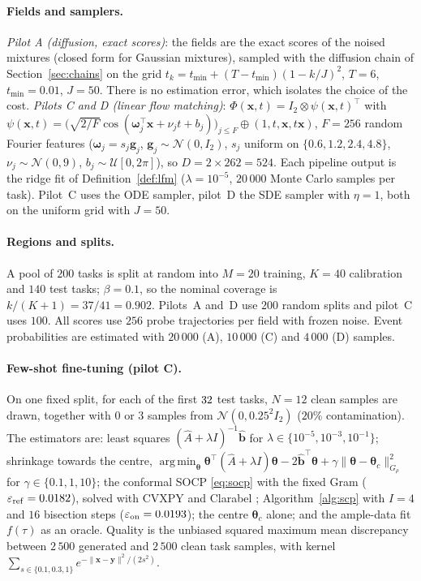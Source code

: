 \documentclass{article}
\DeclareMathOperator*{\argmin}{arg\,min}
\newcommand{\bth}{\boldsymbol{\theta}}
\newcommand{\bx}{\mathbf{x}}
\newcommand{\by}{\mathbf{y}}
\theoremstyle{plain}
\begin{document}
\paragraph{Fields and samplers.}
\emph{Pilot A (diffusion, exact scores)}: the fields are the exact scores of the noised mixtures
(closed form for Gaussian mixtures), sampled with the diffusion chain of
Section~\ref{sec:chains} on the grid $t_k=t_{\min}+(T-t_{\min})(1-k/J)^2$, $T=6$,
$t_{\min}=0.01$, $J=50$. There is no estimation error, which isolates the choice of the cost.
\emph{Pilots C and D (linear flow matching)}: $\Phi(\bx,t)=I_2\otimes\psi(\bx,t)^\top$ with
$\psi(\bx,t)=\big(\sqrt{2/F}\cos(\boldsymbol{\omega}_j^\top\bx+\nu_jt+b_j)\big)_{j\leq F}\oplus(1,t,\bx,t\bx)$,
$F=256$ random Fourier features \citep{rahimi2007random} ($\boldsymbol{\omega}_j=s_j\mathbf{g}_j$,
$\mathbf{g}_j\sim\mathcal{N}(0,I_2)$, $s_j$ uniform on $\{0.6,1.2,2.4,4.8\}$, $\nu_j\sim\mathcal{N}(0,9)$,
$b_j\sim\mathcal{U}[0,2\pi]$), so $D=2\times262=524$. Each pipeline output is the ridge fit of
Definition~\ref{def:lfm} ($\lambda=10^{-5}$, $20\,000$ Monte Carlo samples per task). Pilot~C uses the
ODE sampler, pilot~D the SDE sampler with $\eta=1$, both on the uniform grid with $J=50$.

\paragraph{Regions and splits.}
A pool of $200$ tasks is split at random into $M=20$ training, $K=40$ calibration and $140$ test
tasks; $\beta=0.1$, so the nominal coverage is $k/(K+1)=37/41=0.902$. Pilots~A and~D use $200$
random splits and pilot~C uses $100$. All scores use $256$ probe trajectories per field with frozen
noise. Event probabilities are estimated with $20\,000$ (A), $10\,000$ (C) and $4\,000$ (D)
samples.

\paragraph{Few-shot fine-tuning (pilot C).}
On one fixed split, for each of the first $32$ test tasks, $N=12$ clean samples are drawn,
together with $0$ or $3$ samples from $\mathcal{N}(0,0.25^2I_2)$ ($20\%$ contamination). The
estimators are: least squares $(\hat A+\lambda I)^{-1}\hat{\mathbf{b}}$ for
$\lambda\in\{10^{-5},10^{-3},10^{-1}\}$; shrinkage towards the centre,
$\argmin_{\bth}\bth^\top(\hat A+\lambda I)\bth-2\hat{\mathbf{b}}^\top\bth+\gamma\|\bth-\bth_c\|_{G_\rho}^2$ for
$\gamma\in\{0.1,1,10\}$; the conformal SOCP \eqref{eq:socp} with the fixed Gram
($\varepsilon_{\mathrm{ref}}=0.0182$), solved with CVXPY \citep{diamond2016cvxpy} and Clarabel
\citep{Clarabel_2024}; Algorithm~\ref{alg:scp} with $I=4$ and $16$ bisection steps
($\varepsilon_{\mathrm{on}}=0.0193$); the centre $\bth_c$ alone; and the ample-data fit $f(\tau)$ as an
oracle. Quality is the unbiased squared maximum mean discrepancy \citep{gretton2012kernel}
between $2\,500$ generated and $2\,500$ clean task samples, with kernel
$\sum_{s\in\{0.1,0.3,1\}}e^{-\|\bx-\by\|^2/(2s^2)}$.
\end{document}
